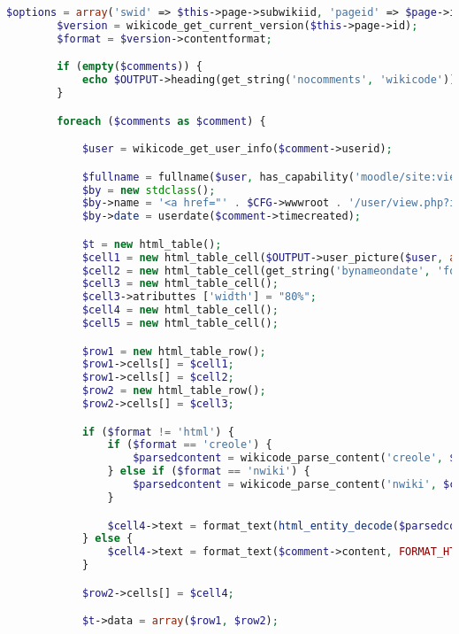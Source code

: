 \begin{lstlisting}[language=PHP]
        $options = array('swid' => $this->page->subwikiid, 'pageid' => $page->id);
        $version = wikicode_get_current_version($this->page->id);
        $format = $version->contentformat;

        if (empty($comments)) {
            echo $OUTPUT->heading(get_string('nocomments', 'wikicode'));
        }

        foreach ($comments as $comment) {

            $user = wikicode_get_user_info($comment->userid);

            $fullname = fullname($user, has_capability('moodle/site:viewfullnames', get_context_instance(CONTEXT_COURSE, $course->id)));
            $by = new stdclass();
            $by->name = '<a href="' . $CFG->wwwroot . '/user/view.php?id=' . $user->id . '&amp;course=' . $course->id . '">' . $fullname . '</a>';
            $by->date = userdate($comment->timecreated);

            $t = new html_table();
            $cell1 = new html_table_cell($OUTPUT->user_picture($user, array('popup' => true)));
            $cell2 = new html_table_cell(get_string('bynameondate', 'forum', $by));
            $cell3 = new html_table_cell();
            $cell3->atributtes ['width'] = "80%";
            $cell4 = new html_table_cell();
            $cell5 = new html_table_cell();

            $row1 = new html_table_row();
            $row1->cells[] = $cell1;
            $row1->cells[] = $cell2;
            $row2 = new html_table_row();
            $row2->cells[] = $cell3;

            if ($format != 'html') {
                if ($format == 'creole') {
                    $parsedcontent = wikicode_parse_content('creole', $comment->content, $options);
                } else if ($format == 'nwiki') {
                    $parsedcontent = wikicode_parse_content('nwiki', $comment->content, $options);
                }

                $cell4->text = format_text(html_entity_decode($parsedcontent['parsed_text']), FORMAT_HTML);
            } else {
                $cell4->text = format_text($comment->content, FORMAT_HTML);
            }

            $row2->cells[] = $cell4;

            $t->data = array($row1, $row2);


\end{lstlisting}
